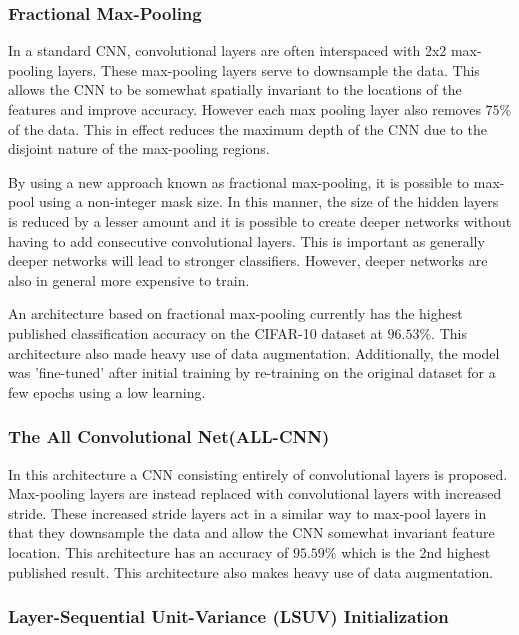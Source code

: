 \subsubsection{Fractional Max-Pooling}

In a standard CNN, convolutional layers are often interspaced with 2x2 max-pooling layers. These max-pooling layers serve to downsample the data. This allows the CNN to be somewhat spatially invariant to the locations of the features and improve accuracy. However each max pooling layer also removes $75\%$ of the data\cite{graham2014fractional}. This in effect reduces the maximum depth of the CNN due to the disjoint nature of the max-pooling regions.

By using a new approach known as fractional max-pooling, it is possible to max-pool using a non-integer mask size. In this manner, the size of the hidden layers is reduced by a lesser amount and it is possible to create deeper networks without having to add consecutive convolutional layers. This is important as generally deeper networks will lead to stronger classifiers\cite{he2016deep}. However, deeper networks are also in general more expensive to train.

An architecture based on fractional max-pooling currently has the highest published classification accuracy on the CIFAR-10 dataset at $96.53\%$. This architecture also made heavy use of data augmentation. Additionally, the model was 'fine-tuned' after initial training by re-training on the original dataset for a few epochs using a low learning.

\subsubsection{The All Convolutional Net(ALL-CNN)}

In this architecture\cite{springenberg2014striving} a CNN consisting entirely of convolutional layers is proposed. Max-pooling layers are instead replaced with convolutional layers with increased stride. These increased stride layers act in a similar way to max-pool layers in that they downsample the data and allow the CNN somewhat invariant feature location. This architecture has an accuracy of $95.59\%$ which is the 2nd highest published result. This architecture also makes heavy use of data augmentation.

\subsubsection{Layer-Sequential Unit-Variance (LSUV) Initialization}

